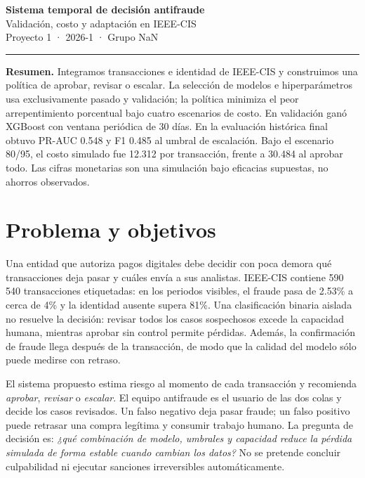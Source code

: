 \documentclass[11pt,letterpaper]{article}
\begin{document}
\begin{center}
{\Large\sffamily\bfseries\color{navy} Sistema temporal de decisión antifraude}\\[2pt]
{\large\sffamily Validación, costo y adaptación en IEEE-CIS}\\[4pt]
{\small Proyecto 1 · 2026-1 · Grupo NaN}
\end{center}
\vspace{-4pt}\hrule\vspace{5pt}

\textbf{Resumen.} Integramos transacciones e identidad de IEEE-CIS y construimos una política de aprobar, revisar o escalar. La selección de modelos e hiperparámetros usa exclusivamente pasado y validación; la política minimiza el peor arrepentimiento porcentual bajo cuatro escenarios de costo. En validación ganó XGBoost con ventana periódica de 30 días. En la evaluación histórica final obtuvo PR-AUC 0.548 y F1 0.485 al umbral de escalación. Bajo el escenario 80/95, el costo simulado fue 12.312 por transacción, frente a 30.484 al aprobar todo. Las cifras monetarias son una simulación bajo eficacias supuestas, no ahorros observados.

\section{Problema y objetivos}
Una entidad que autoriza pagos digitales debe decidir con poca demora qué transacciones deja pasar y cuáles envía a sus analistas. IEEE-CIS contiene 590\,540 transacciones etiquetadas: en los periodos visibles, el fraude pasa de 2.53\% a cerca de 4\% y la identidad ausente supera 81\%. Una clasificación binaria aislada no resuelve la decisión: revisar todos los casos sospechosos excede la capacidad humana, mientras aprobar sin control permite pérdidas. Además, la confirmación de fraude llega después de la transacción, de modo que la calidad del modelo sólo puede medirse con retraso.

El sistema propuesto estima riesgo al momento de cada transacción y recomienda \emph{aprobar}, \emph{revisar} o \emph{escalar}. El equipo antifraude es el usuario de las dos colas y decide los casos revisados. Un falso negativo deja pasar fraude; un falso positivo puede retrasar una compra legítima y consumir trabajo humano. La pregunta de decisión es: \emph{¿qué combinación de modelo, umbrales y capacidad reduce la pérdida simulada de forma estable cuando cambian los datos?} No se pretende concluir culpabilidad ni ejecutar sanciones irreversibles automáticamente.
\end{document}
